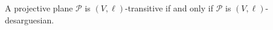 A projective plane $\mathcal{P}$ is $(V,\ell)$-transitive if and only if $\mathcal{P}$ is $(V,\ell)$-desarguesian.
